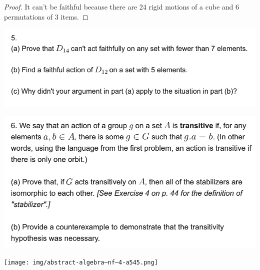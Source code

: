 \begin{proof}
  It can't be faithful because there are 24 rigid motions of a cube and 6 permutations of 3 items.
\end{proof}


\begin{mdframed}
\includegraphics[width=400pt]{img/abstract-algebra--nf--4-1b73.png}
\end{mdframed}





\begin{mdframed}
\includegraphics[width=400pt]{img/abstract-algebra--nf--4-50ae.png}
\end{mdframed}

\begin{intuition*}
  \begin{mdframed}
\texttt{[image: img/abstract-algebra--nf--4-a545.png]}
\end{mdframed}
\end{intuition*}

